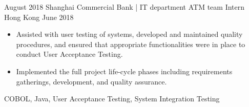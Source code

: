 \begin{experiences}
  \emptySeparator
  \experience
    {August 2018}     { Shanghai Commercial Bank | IT department ATM team Intern}{ Hong Kong}
    {June 2018}    {
                      \begin{itemize}
                        \item Assisted with user testing of systems, developed and maintained quality procedures, and ensured that appropriate functionalities were in place to conduct User Acceptance Testing. 
                        \item Implemented the full project life-cycle phases including requirements gatherings, development, and quality assurance.            
                      \end{itemize}
                    }
                    {COBOL, Java, User Acceptance Testing, System Integration Testing}
  
\end{experiences}
